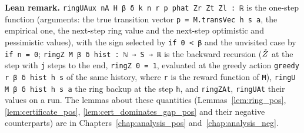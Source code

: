 \textbf{Lean remark.} \texttt{ringUAux nA H β δ k n r p phat Zr Zt Zl : ℝ} is the one-step
function (arguments: the true transition vector \texttt{p = M.transVec h s a}, the empirical
one, the next-step ring value and the next-step optimistic and pessimistic values), with the
sign selected by \texttt{if 0 < β} and the unvisited case by \texttt{if n = 0};
\texttt{ringZ M β δ hist : ℕ → S → ℝ} is the backward recursion ($\mathring{Z}$ at the step with
\texttt{j} steps to the end, \texttt{ringZ 0 = 1}, evaluated at the greedy action
\texttt{greedy r β δ hist h s} of the same history, where \texttt{r} is the reward function of
\texttt{M}), \texttt{ringU M β δ hist h s a} the ring backup at the step \texttt{h}, and
\texttt{ringZAt}, \texttt{ringUAt} their values on a run. The lemmas about these quantities
(Lemmas~\ref{lem:ring_pos}, \ref{lem:certificate_pos}, \ref{lem:cert_dominates_gap_pos} and
their negative counterparts) are in Chapters~\ref{chap:analysis_pos} and~\ref{chap:analysis_neg}.
